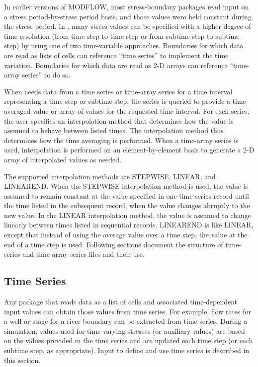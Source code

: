 
In earlier versions of MODFLOW, most stress-boundary packages read input on a stress period-by-stress period basis, and those values were held constant during the stress period. In \programname{}, many stress values can be specified with a higher degree of time resolution (from time step to time step or from subtime step to subtime step) by using one of two time-variable approaches. Boundaries for which data are read as lists of cells can reference ``time series'' to implement the time variation. Boundaries for which data are read as 2-D arrays can reference ``time-array series'' to do so.

When \programname{} needs data from a time series or time-array series for a time interval representing a time step or subtime step, the series is queried to provide a time-averaged value or array of values for the requested time interval.  For each series, the user specifies an interpolation method that determines how the value is assumed to behave between listed times. The interpolation method thus determines how the time averaging is performed. When a time-array series is used, interpolation is performed on an element-by-element basis to generate a 2-D array of interpolated values as needed. 

The supported interpolation methods are STEPWISE, LINEAR, and LINEAREND. When the STEPWISE interpolation method is used, the value is assumed to remain constant at the value specified in one time-series record until the time listed in the subsequent record, when the value changes abruptly to the new value. In the LINEAR interpolation method, the value is assumed to change linearly between times listed in sequential records. LINEAREND is like LINEAR, except that instead of using the average value over a time step, the value at the end of a time step is used. Following sections document the structure of time-series and time-array-series files and their use.

\subsection{Time Series}

Any package that reads data as a list of cells and associated time-dependent input values can obtain those values from time series. For example, flow rates for a well or stage for a river boundary can be extracted from time series. During a simulation, values used for time-varying stresses (or auxiliary values) are based on the values provided in the time series and are updated each time step (or each subtime step, as appropriate). Input to define and use time series is described in this section. 

